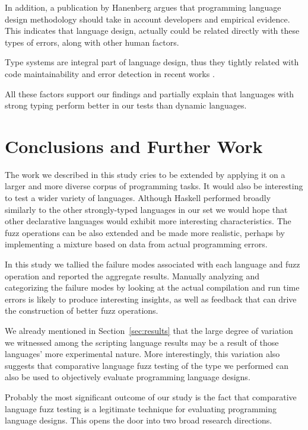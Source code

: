\documentclass[10pt]{sigplanconf}
\begin{document}
In addition, a publication by Hanenberg \cite{HANE10} argues that programming 
language design methodology should take in account developers and empirical evidence.
This indicates that language design, actually could be related directly with 
these types of errors, along with other human factors.

Type systems are integral part of language design, thus they tightly related with
code maintainability and error detection in recent works \cite{STHA11,KHRT12}.

All these factors support our findings and partially explain that languages with
strong typing perform better in our tests than dynamic languages.

\section{Conclusions and Further Work} %
\label{sec:conclusions}

The work we described in this study cries to be extended
by applying it on a larger and more diverse corpus of programming tasks.
It would also be interesting to test a wider variety of languages.
Although Haskell performed broadly similarly to the other strongly-typed
languages in our set we would hope that other declarative languages
would exhibit more interesting characteristics.
The fuzz operations can be also extended and be made more realistic,
perhaps by implementing a mixture based on data from actual programming
errors.

In this study we tallied the failure modes associated with each
language and fuzz operation and reported the aggregate results.
Manually analyzing and categorizing the failure modes by looking
at the actual compilation and run time errors
is likely to produce interesting insights,
as well as feedback that can drive the
construction of better fuzz operations.

We already mentioned in Section~\ref{sec:results} that the
large degree of variation we witnessed among the scripting
language results may be a result of those languages'
more experimental nature.
More interestingly, this variation also suggests that
comparative language fuzz testing of the type we performed
can also be used to objectively evaluate programming language
designs.

Probably the most significant outcome of our study is the
fact that comparative language fuzz testing is a
legitimate technique for evaluating programming language designs.
This opens the door into two broad research directions.
\end{document}
